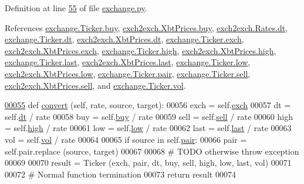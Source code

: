 Definition at line \hyperlink{exchange_8py_source_l00055}{55} of file \hyperlink{exchange_8py_source}{exchange.\+py}.



References \hyperlink{exchange_8py_source_l00048}{exchange.\+Ticker.\+buy}, \hyperlink{exch2exch_8py_source_l00059}{exch2exch.\+Xbt\+Prices.\+buy}, \hyperlink{exch2exch_8py_source_l00028}{exch2exch.\+Rates.\+dt}, \hyperlink{exchange_8py_source_l00047}{exchange.\+Ticker.\+dt}, \hyperlink{exch2exch_8py_source_l00057}{exch2exch.\+Xbt\+Prices.\+dt}, \hyperlink{exchange_8py_source_l00045}{exchange.\+Ticker.\+exch}, \hyperlink{exch2exch_8py_source_l00064}{exch2exch.\+Xbt\+Prices.\+exch}, \hyperlink{exchange_8py_source_l00050}{exchange.\+Ticker.\+high}, \hyperlink{exch2exch_8py_source_l00061}{exch2exch.\+Xbt\+Prices.\+high}, \hyperlink{exchange_8py_source_l00052}{exchange.\+Ticker.\+last}, \hyperlink{exch2exch_8py_source_l00063}{exch2exch.\+Xbt\+Prices.\+last}, \hyperlink{exchange_8py_source_l00051}{exchange.\+Ticker.\+low}, \hyperlink{exch2exch_8py_source_l00062}{exch2exch.\+Xbt\+Prices.\+low}, \hyperlink{exchange_8py_source_l00046}{exchange.\+Ticker.\+pair}, \hyperlink{exchange_8py_source_l00049}{exchange.\+Ticker.\+sell}, \hyperlink{exch2exch_8py_source_l00058}{exch2exch.\+Xbt\+Prices.\+sell}, and \hyperlink{exchange_8py_source_l00053}{exchange.\+Ticker.\+vol}.


\begin{DoxyCode}
\hypertarget{classexchange_1_1_ticker.tex_l00055}{}\hyperlink{classexchange_1_1_ticker_afa66aae0fb37d76d4e19bd9d7af79ff9}{00055}     \textcolor{keyword}{def }\hyperlink{classexchange_1_1_ticker_afa66aae0fb37d76d4e19bd9d7af79ff9}{convert} (self, rate, source, target):
00056         exch = self.\hyperlink{classexchange_1_1_ticker_a33f33fe9a12da3ce52938afdc577c061}{exch}
00057         dt   = self.\hyperlink{classexchange_1_1_ticker_a45e3162d9956cee797f21d93c44c6baf}{dt}   / rate
00058         buy  = self.\hyperlink{classexchange_1_1_ticker_a2ca48c3fa9aba92241392a05bef39324}{buy}  / rate
00059         sell = self.\hyperlink{classexchange_1_1_ticker_a5ba9e257d2ed28f02528a37d9ebd793e}{sell} / rate
00060         high = self.\hyperlink{classexchange_1_1_ticker_aace381ca15468df6a40e8d86b7710a7f}{high} / rate
00061         low  = self.\hyperlink{classexchange_1_1_ticker_a1c1f26a47a82fc799fcebf158e104405}{low}  / rate
00062         last = self.\hyperlink{classexchange_1_1_ticker_add7c2d95fa790dcdffddae2e584ce5f5}{last} / rate
00063         vol  = self.\hyperlink{classexchange_1_1_ticker_a24c0dd396aebc54c06e429a68c964ea3}{vol}  / rate
00064 
00065         \textcolor{keywordflow}{if} source \textcolor{keywordflow}{in} self.\hyperlink{classexchange_1_1_ticker_a382f9199d13a7b5929a26065fad4e491}{pair}:
00066             pair = self.pair.replace (source, target)
00067         
00068         \textcolor{comment}{# TODO otherwise throw exception }
00069         
00070         result = Ticker (exch, pair, dt, buy, sell, high, low, last, vol)
00071         
00072         \textcolor{comment}{# Normal function termination}
00073         \textcolor{keywordflow}{return} result 
00074         
\end{DoxyCode}
